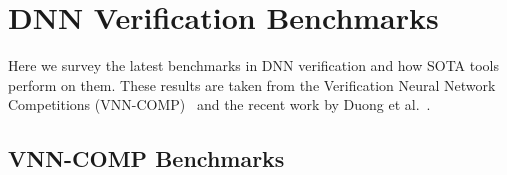 \documentclass[oneside,11pt,dvipsnames]{book}
\numberwithin{equation}{section}
\theoremstyle{definition}
\theoremstyle{remark}
\newcommand{\tvn}[1]{\iftoggle{usecomment}{{\color{red}{[TVN]: #1}}}{}}
\newcommand{\prooflang}{\texttt{BaB$_{\text{ProofLang}}$}}
\newcommand{\proofcheck}{\texttt{BaB$_{\text{ProofCheck}}$}}
\begin{document}




\chapter{DNN Verification Benchmarks}\label{chap:benchmarks}
Here we survey the latest benchmarks in DNN verification and how SOTA tools perform on them.  These results are taken from the Verification Neural Network Competitions (VNN-COMP)~\cite{brix2024fifth} and the recent work by Duong et al.~\cite{duong2024harnessing}.




\section{VNN-COMP Benchmarks}


\tvn{check this table with VNN-COMP'24 reports. The Report seems to have a lot more benchmarks for regular tracks. Also many numbers don't quite match. We should probably use the benchmarks from VNN-COMP'24 report. I also ? on place for you to fill in}
\end{document}
